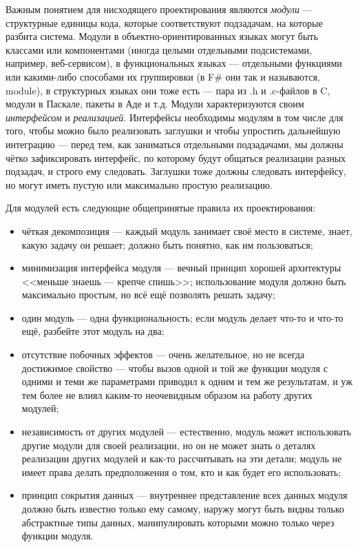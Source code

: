 \documentclass{../../text-style}
\begin{document}
Важным понятием для нисходящего проектирования являются \textit{модули} --- структурные единицы кода, которые соответствуют подзадачам, на которые разбита система. Модули в объектно-ориентированных языках могут быть классами или компонентами (иногда целыми отдельными подсистемами, например, веб-сервисом), в функциональных языках --- отдельными функциями или какими-либо способами их группировки (в F\# они так и называются, module), в структурных языках они тоже есть --- пара из .h и .c-файлов в C, модули в Паскале, пакеты в Аде и т.д. Модули характеризуются своим \textit{интерфейсом} и \textit{реализацией}. Интерфейсы необходимы модулям в том числе для того, чтобы можно было реализовать заглушки и чтобы упростить дальнейшую интеграцию --- перед тем, как заниматься отдельными подзадачами, мы должны чётко зафиксировать интерфейс, по которому будут общаться реализации разных подзадач, и строго ему следовать. Заглушки тоже должны следовать интерфейсу, но могут иметь пустую или максимально простую реализацию.

Для модулей есть следующие общепринятые правила их проектирования:

\begin{itemize}
    \item чёткая декомпозиция --- каждый модуль занимает своё место в системе, знает, какую задачу он решает; должно быть понятно, как им пользоваться;
    \item минимизация интерфейса модуля --- вечный принцип хорошей архитектуры <<меньше знаешь --- крепче спишь>>; использование модуля должно быть максимально простым, но всё ещё позволять решать задачу;
    \item один модуль --- одна функциональность; если модуль делает что-то и что-то ещё, разбейте этот модуль на два;
    \item отсутствие побочных эффектов --- очень желательное, но не всегда достижимое свойство --- чтобы вызов одной и той же функции модуля с одними и теми же параметрами приводил к одним и тем же результатам, и уж тем более не влиял каким-то неочевидным образом на работу других модулей;
    \item независимость от других модулей --- естественно, модуль может использовать другие модули для своей реализации, но он не может знать о деталях реализации других модулей и как-то рассчитывать на эти детали; модуль не имеет права делать предположения о том, кто и как будет его использовать;
    \item принцип сокрытия данных --- внутреннее представление всех данных модуля должно быть известно только ему самому, наружу могут быть видны только абстрактные типы данных, манипулировать которыми можно только через функции модуля.
\end{itemize}
\end{document}
